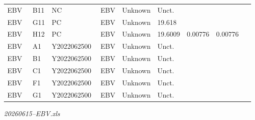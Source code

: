 \documentclass[UTF8,10pt,a4paper,fontset=fandol]{ctexart}
\begin{document}
\begin{center}
\begin{tabular}{p{0.18\linewidth}p{0.06\linewidth}p{0.25\linewidth}p{0.07\linewidth}p{0.10\linewidth}p{0.08\linewidth}p{0.09\linewidth}p{0.09\linewidth}p{0.09\linewidth}}
EBV & B11 & NC & EBV & Unknown & Unct. & & & \\
EBV & G11 & PC & EBV & Unknown & 19.618 & & & \\
EBV & H12 & PC & EBV & Unknown & 19.6009 & 0.00776 & 0.00776 & \\
EBV & A1  & Y2022062500 & EBV & Unknown & Unct. & & & \\
EBV & B1  & Y2022062500 & EBV & Unknown & Unct. & & & \\
EBV & C1  & Y2022062500 & EBV & Unknown & Unct. & & & \\
EBV & F1  & Y2022062500 & EBV & Unknown & Unct. & & & \\
EBV & G1  & Y2022062500 & EBV & Unknown & Unct. & & & \\
\end{tabular}
\end{center}

\noindent\textit{20260615--EBV.xls}


\newpage

\begin{figure}[ht]
\centering
{}
\end{figure}
\end{document}
